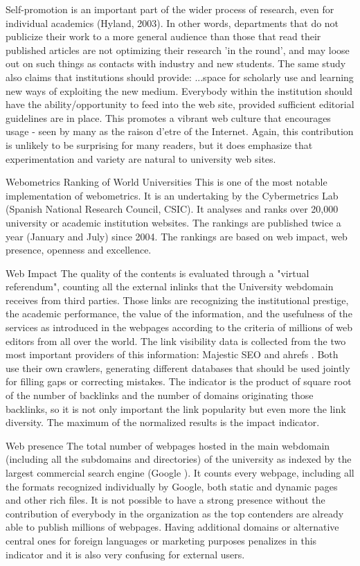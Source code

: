Self-promotion is an important part of the wider process of research, even for individual academics (Hyland, 2003). In other words, departments that do not publicize their work to a more general audience than those that read their published articles are not optimizing their research 'in the round', and may loose out on such things as contacts with industry and new students. The same study also claims that institutions should provide:
...space for scholarly use and learning new ways of exploiting the new medium. Everybody within the institution should have the ability/opportunity to feed into the web site, provided sufficient editorial guidelines are in place.
This promotes a vibrant web culture that encourages usage - seen by many as the raison d'etre of the Internet.
Again, this contribution is unlikely to be surprising for many readers, but it does emphasize that experimentation and variety are natural to university web sites.

Webometrics Ranking of World Universities
This is one of the most notable implementation of webometrics. It is an undertaking by the Cybermetrics Lab (Spanish National Research Council, CSIC). It analyses and ranks over 20,000 university or academic institution websites. The rankings are published twice a year (January and July) since 2004. The rankings are based on web impact, web presence, openness and excellence.

Web Impact
The quality of the contents is evaluated through a "virtual referendum", counting all the external inlinks that the University webdomain receives from third parties. Those links are recognizing the institutional prestige, the academic performance, the value of the information, and the usefulness of the services as introduced in the webpages according to the criteria of millions of web editors from all over the world. The link visibility data is collected from the two most important providers of this information: Majestic SEO and ahrefs . Both use their own crawlers, generating different databases that should be used jointly for filling gaps or correcting mistakes. The indicator is the product of square root of the number of backlinks and the number of domains originating those backlinks, so it is not only important the link popularity but even more the link diversity. The maximum of the normalized results is the impact indicator.

Web presence
The total number of webpages hosted in the main webdomain (including all the subdomains and directories) of the university as indexed by the largest commercial search engine (Google ). It counts every webpage, including all the formats recognized individually by Google, both static and dynamic pages and other rich files. It is not possible to have a strong presence without the contribution of everybody in the organization as the top contenders are already able to publish millions of webpages. Having additional domains or alternative central ones for foreign languages or marketing purposes penalizes in this indicator and it is also very confusing for external users.

